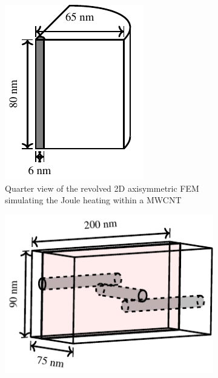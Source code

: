 \documentclass[11pt,review,times]{article}
\begin{document}
\begin{figure}[htb]
	\center
	\begin{subfigure}{0.28\textwidth}
		\center
		\captionsetup{width=0.9\textwidth}
		\includegraphics[width=\textwidth]{geometry_axisymmetric}
		\caption{Quarter view of the revolved 2D axisymmetric FEM simulating the Joule heating within a MWCNT}
		\label{fig:geometry_axisymmetric}
	\end{subfigure}%
	\begin{subfigure}{0.44\textwidth}
		\center
		\captionsetup{width=0.9\textwidth}
		\includegraphics[width=\textwidth]{geometry_3D}

\end{subfigure}
\end{figure}
\end{document}
